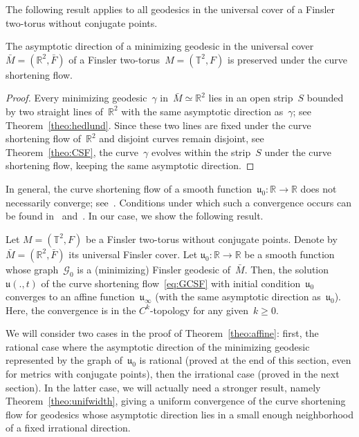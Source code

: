\documentclass[AHL,Unicode,longabstracts,published]{cedram}
\newcommand{\GG}{\mathcal{G}}
\newcommand{\R}{\mathbb{R}}
\newcommand{\T}{\mathbb{T}}
\newcommand{\bu}{\mathfrak{u}}
\begin{document}
The following result applies to all geodesics in the universal cover of a Finsler two-torus without conjugate points.

\begin{prop}\label{prop:direction}
The asymptotic direction of a minimizing geodesic in the universal cover~$\bar{M}=(\R^2,\bar{F})$ of a Finsler two-torus~$M=(\T^2,F)$ is preserved under the curve shortening flow.
\end{prop}

\begin{proof}
Every minimizing geodesic~$\gamma$ in~$\bar{M} \simeq \R^2$ lies in an open strip~$S$ bounded by two straight lines of~$\R^2$ with the same asymptotic direction as~$\gamma$; see Theorem~\ref{theo:hedlund}. Since these two lines are fixed under the curve shortening flow of~$\R^2$ and disjoint curves remain disjoint, see Theorem~\ref{theo:CSF}, the curve~$\gamma$ evolves within the strip~$S$ under the curve shortening flow, keeping the same asymptotic direction.
\end{proof}

In general, the curve shortening flow of a smooth function~$\bu_0:\R \to \R$ does not necessarily converge; see~\cite{EH89}. Conditions under which such a convergence occurs can be found in~\cite{NT07} and~\cite{WW}. In our case, we show the following result.

\begin{theo}\label{theo:affine}
Let $M=(\T^2,F)$ be a Finsler two-torus without conjugate points. Denote by~$\bar{M}=(\R^2,\bar{F})$ its universal Finsler cover. Let $\bu_0:\R \to \R$ be a smooth function whose graph~$\GG_0$ is a (minimizing) Finsler geodesic of~$\bar{M}$. Then, the solution~$\bu(.,t)$ of the curve shortening flow~\eqref{eq:GCSF} with initial condition~$\bu_0$ converges to an affine function~$\bu_\infty$ (with the same asymptotic direction as~$\bu_0$). Here, the convergence is in the $C^k$-topology for any given~$k \geq 0$.
\end{theo}

We will consider two cases in the proof of Theorem~\ref{theo:affine}: first, the rational case where the asymptotic direction of the minimizing geodesic represented by the graph of~$\bu_0$ is rational (proved at the end of this section, even for metrics with conjugate points), then the irrational case (proved in the next section). In the latter case, we will actually need a stronger result, namely Theorem~\ref{theo:unifwidth}, giving a uniform convergence of the curve shortening flow for geodesics whose asymptotic direction lies in a small enough neighborhood of a fixed irrational direction.
\end{document}

